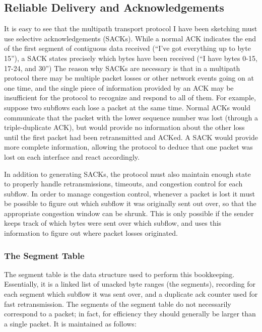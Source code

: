 \subsection{Reliable Delivery and Acknowledgements}

It is easy to see that the multipath transport protocol I have been sketching must use selective acknowledgements (SACKs). While a normal ACK indicates the end of the first segment of contiguous data received (``I've got everything up to byte 15''), a SACK states precisely which bytes have been received (``I have bytes 0-15, 17-24, and 30'') The reason why SACKs are necessary is that in a multipath protocol there may be multiple packet losses or other network events going on at one time, and the single piece of information provided by an ACK may be insufficient for the protocol to recognize and respond to all of them. For example, suppose two subflows each lose a packet at the same time. Normal ACKs would communicate that the packet with the lower sequence number was lost (through a triple-duplicate ACK), but would provide no information about the other loss until the first packet had been retransmitted and ACKed. A SACK would provide more complete information, allowing the protocol to deduce that one packet was lost on each interface and react accordingly.

In addition to generating SACKs, the protocol must also maintain enough state to properly handle retransmissions, timeouts, and congestion control for each subflow. In order to manage congestion control, whenever a packet is lost it must be possible to figure out which subflow it was originally sent out over, so that the appropriate congestion window can be shrunk. This is only possible if the sender keeps track of which bytes were sent over which subflow, and uses this information to figure out where packet losses originated.

\subsubsection{The Segment Table}
The segment table is the data structure used to perform this bookkeeping. Essentially, it is a linked list of unacked byte ranges (the segments), recording for each segment which subflow it was sent over, and a duplicate ack counter used for fast retransmission. The segments of the segment table do not necessarily correspond to a packet; in fact, for efficiency they should generally be larger than a single packet. It is maintained as follows:

